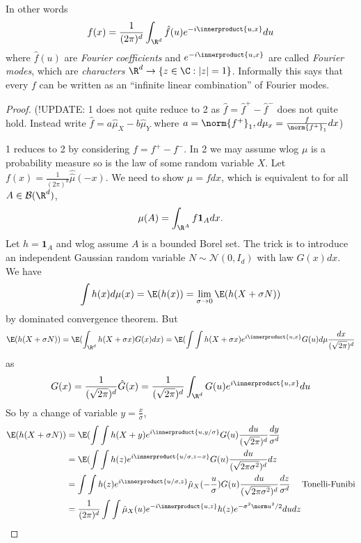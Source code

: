 \documentclass[a4paper]{article}
\newcommand*{\ip}{\innerproduct} %
\begin{document}
\begin{remark}
  In other words
  \[
    f(x) = \frac{1}{(2\pi)^d} \int_{\R^d} \hat f(u) e^{-i \ip{u, x}} du
  \]
  where \(\hat f(u)\) are \emph{Fourier coefficients} and \(e^{-i\ip{u, x}}\) are called \emph{Fourier modes}, which are \emph{characters} \(\R^d \to \{z \in \C: |z| = 1\}\). Informally this says that every \(f\) can be written as an ``infinite linear combination'' of Fourier modes.
\end{remark}

\begin{proof}
  (!UPDATE: 1 does not quite reduce to 2 as \(\hat f = \hat f^+ - \hat f^-\) does not quite hold. Instead write \(\hat f = a \hat \mu_X - b \hat \mu_Y\) where \(a = \norm{f^+}_1, d\mu_x = \frac{f}{\norm{f^+}_1}dx\))
  
  1 reduces to 2 by considering \(f = f^+ - f^-\). In 2 we may assume wlog \(\mu\) is a probability measure so is the law of some random variable \(X\). Let \(f(x) = \frac{1}{(2\pi)^d} \hat{\hat \mu}(-x)\). We need to show \(\mu = fdx\), which is equivalent to for all \(A \in \mathcal B(\R^d)\),
  \[
    \mu(A) = \int_{\R^A} f \mathbf 1_A dx.
  \]
  Let \(h = \mathbf 1_A\) and wlog assume \(A\) is a bounded Borel set. The trick is to introduce an independent Gaussian random variable \(N \sim \mathcal N(0, I_d)\) with law \(G(x) dx\). We have
  \[
    \int h(x) d\mu(x) = \E(h(x)) = \lim_{\sigma \to 0} \E(h(X + \sigma N))
  \]
  by dominated convergence theorem. But
  \[
    \E(h(X + \sigma N))
    = \E(\int_{\R^d} h(X + \sigma x) G(x) dx)
    = \E(\int \int h(X + \sigma x) e^{i \ip{u, x}} G(u) d \mu \frac{dx}{(\sqrt{2\pi})^d}
  \]
  as
  \[
    G(x) = \frac{1}{(\sqrt{2\pi})^d} \hat G(x) = \frac{1}{(\sqrt{2\pi})^d} \int_{\R^d} G(u) e^{i \ip{u, x}} du
  \]
  So by a change of variable \(y = \frac{x}{\sigma}\),
  \begin{align*}
    \E(h(X + \sigma N))
    &= \E(\int \int h(X + y) e^{i \ip{u, y/\sigma}} G(u) \frac{du}{(\sqrt{2\pi})^d} \frac{dy}{\sigma^d} \\
    &= \E(\int \int h(z) e^{i \ip{u/\sigma, z - x}} G(u) \frac{du}{(\sqrt{2\pi \sigma^2})^d} dz \\
    &= \int \int h(z) e^{i \ip{u/\sigma, z}} \hat \mu_X(- \frac{u}{\sigma}) G(u) \frac{du}{(\sqrt{2\pi \sigma^2})^d} \frac{dz}{\sigma^d} \quad \text{ Tonelli-Funibi} \\
    &= \frac{1}{(2\pi)^d} \int \int \hat \mu_X(u) e^{-i \ip{u, z}} h(z) e^{-\sigma^2 \norm u^2/2} dudz
  \end{align*}
\end{proof}
\end{document}

